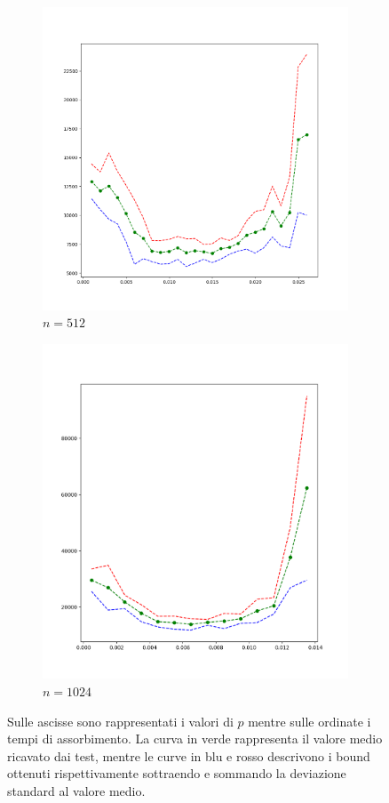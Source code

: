 \documentclass[../Tesi.tex]{subfiles}
\begin{document}
\begin{figure}[H]
\centering
    \begin{subfigure}[b]{0.45\textwidth}
      \centering
      \includegraphics[width=0.8\linewidth]{imgs/ER_p_variation/n=512 a=025.png}
      \caption*{$n=512$}
      \label{fig:sub1}
    \end{subfigure}%
    \begin{subfigure}[b]{0.45\textwidth}
      \centering
      \includegraphics[width=0.8\linewidth]{imgs/ER_p_variation/n=1024 a=025.png}
      \caption*{$n=1024$}
      \label{fig:sub2}
    \end{subfigure}
\caption{Sulle ascisse sono rappresentati i valori di $p$ mentre sulle ordinate i tempi di assorbimento. La curva in verde rappresenta il valore medio ricavato dai test, mentre le curve in blu e rosso descrivono i bound ottenuti rispettivamente sottraendo e sommando la deviazione standard al valore medio.}
\label{img: ER p variation}
\end{figure}
\end{document}
